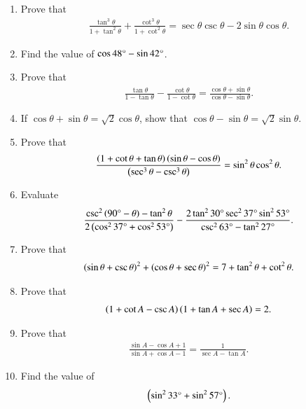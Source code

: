\begin{enumerate}[label=\thesubsection.\arabic*,ref=\thesubsection.\theenumi,itemsep=1pt]
\hfill{}\item Prove that 
\begin{align*}
\frac{\tan^3 \theta}{1+\tan^2 \theta} + \frac{\cot^3 \theta}{1 + \cot^2 \theta} =  \sec \theta  \csc  \theta - 2 \sin \theta \cos \theta  
.\end{align*}
\hfill{}
\item Find the value of $\cos {48\degree} - \sin {42\degree}$.
\hfill{}\item Prove that 
\begin{align*}
   {\frac{\tan\theta}{1-\tan\theta}} - {\frac{\cot\theta}{1-\cot\theta}}={\frac{\cos\theta+ \sin\theta}{\cos\theta-\sin\theta}}
.\end{align*}
\hfill{}\item If ${\cos\theta + \sin\theta} = {\sqrt 2}{\cos\theta}$, show that ${\cos\theta - \sin\theta} = {\sqrt 2}{\sin\theta}$.
\hfill{}\item Prove that 
\begin{align*}
    {\frac{\ensuremath{\left(1+\cot\theta+\tan\theta\right)}\ensuremath{\left(\sin\theta-\cos\theta\right)}}{\ensuremath{\left(\sec^3\theta-\csc^3\theta\right)}}} = \sin^2\theta \cos^2\theta
.\end{align*}
\hfill{}\item Evaluate 
\begin{align*}
    \frac{\csc^2\left(90\degree - \theta\right)-\tan^2\theta}{2\left(\cos^2 37\degree + \cos^2 53\degree\right)} - \frac{2\tan^2 30\degree \sec^2 37\degree \sin^2 53\degree}{\csc^2 63\degree - \tan^2 27\degree} 
.\end{align*}
  \hfill{}\item Prove that \begin{align*} \left(\sin\theta + \csc\theta\right)^2 + \left(\cos\theta + \sec\theta\right)^2 = 7 + \tan^2\theta + \cot^2\theta.\end{align*}
  \hfill{}\item Prove that \begin{align*}\left(1+\cot A - \csc A\right) \left(1 + \tan A +\sec A\right) = 2 .\end{align*}
  \hfill{}\item Prove that \begin{align*} \frac{\sin A-\cos A+1}{\sin A+ \cos A-1} =\frac{1}{\sec A-\tan A}.\end{align*}
  \hfill{}
\item Find the value of \begin{align*}\left(\sin^2 33\degree+ \sin^2 57\degree\right).\end{align*}
  

\end{enumerate}
